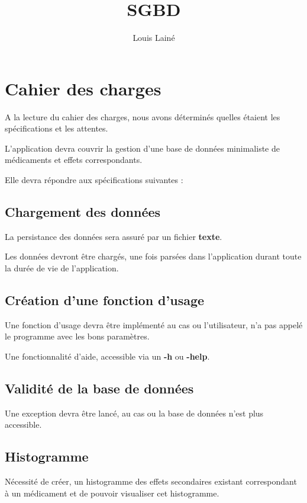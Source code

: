 \documentclass[12pt,a4paper]{report}
\author{Louis Lainé}
\title{SGBD}
\begin{document}


\section{Cahier des charges}
A la lecture du cahier des charges, nous avons déterminés quelles étaient les spécifications et les attentes. 

L'application devra couvrir la gestion d'une base de données minimaliste de médicaments et effets correspondants.

Elle devra répondre aux spécifications suivantes : 

\subsection*{Chargement des données}
\begin{description}
	\item La persistance des données sera assuré par un fichier \textbf{texte}. 
	\item Les données devront être chargés, une fois parsées dans l'application durant toute la durée de vie de l'application. 
\end{description}
\subsection*{Création d'une fonction d'usage}
Une fonction d'usage devra être implémenté au cas ou l'utilisateur, n'a pas appelé le programme avec les bons paramètres. 

Une fonctionnalité d'aide, accessible via un \textbf{-h} ou \textbf{-help}. 

\subsection*{Validité de la base de données}
Une exception devra être lancé, au cas ou la base de données n'est plus accessible. 

\subsection*{Histogramme}
Nécessité de créer, un histogramme des effets secondaires existant correspondant à un médicament et de pouvoir visualiser cet histogramme. 
\end{document}
